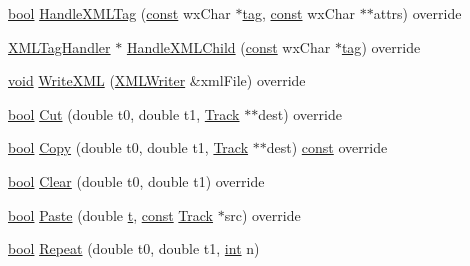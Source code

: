 \begin{DoxyCompactItemize}
\item 
\hyperlink{mac_2config_2i386_2lib-src_2libsoxr_2soxr-config_8h_abb452686968e48b67397da5f97445f5b}{bool} \hyperlink{class_label_track_a1747ad150def0002e512c71213ca3fb8}{Handle\+X\+M\+L\+Tag} (\hyperlink{getopt1_8c_a2c212835823e3c54a8ab6d95c652660e}{const} wx\+Char $\ast$\hyperlink{structtag}{tag}, \hyperlink{getopt1_8c_a2c212835823e3c54a8ab6d95c652660e}{const} wx\+Char $\ast$$\ast$attrs) override
\item 
\hyperlink{class_x_m_l_tag_handler}{X\+M\+L\+Tag\+Handler} $\ast$ \hyperlink{class_label_track_a84b196e796f05d3ce8d8ad14c128b6ef}{Handle\+X\+M\+L\+Child} (\hyperlink{getopt1_8c_a2c212835823e3c54a8ab6d95c652660e}{const} wx\+Char $\ast$\hyperlink{structtag}{tag}) override
\item 
\hyperlink{sound_8c_ae35f5844602719cf66324f4de2a658b3}{void} \hyperlink{class_label_track_a1441e6b9cd7eb6c4209e5b47fb41542b}{Write\+X\+ML} (\hyperlink{class_x_m_l_writer}{X\+M\+L\+Writer} \&xml\+File) override
\item 
\hyperlink{mac_2config_2i386_2lib-src_2libsoxr_2soxr-config_8h_abb452686968e48b67397da5f97445f5b}{bool} \hyperlink{class_label_track_a5684ef2dd7276d9b8818748b7f2427f3}{Cut} (double t0, double t1, \hyperlink{class_track}{Track} $\ast$$\ast$dest) override
\item 
\hyperlink{mac_2config_2i386_2lib-src_2libsoxr_2soxr-config_8h_abb452686968e48b67397da5f97445f5b}{bool} \hyperlink{class_label_track_aee8ad8e315214951cba5f532c9c8a6e5}{Copy} (double t0, double t1, \hyperlink{class_track}{Track} $\ast$$\ast$dest) \hyperlink{getopt1_8c_a2c212835823e3c54a8ab6d95c652660e}{const}  override
\item 
\hyperlink{mac_2config_2i386_2lib-src_2libsoxr_2soxr-config_8h_abb452686968e48b67397da5f97445f5b}{bool} \hyperlink{class_label_track_adde95fb86cb356fcf0569560f84732da}{Clear} (double t0, double t1) override
\item 
\hyperlink{mac_2config_2i386_2lib-src_2libsoxr_2soxr-config_8h_abb452686968e48b67397da5f97445f5b}{bool} \hyperlink{class_label_track_a9c593d64e402ac9667f0868fedf22b62}{Paste} (double \hyperlink{octave__test_8m_aaccc9105df5383111407fd5b41255e23}{t}, \hyperlink{getopt1_8c_a2c212835823e3c54a8ab6d95c652660e}{const} \hyperlink{class_track}{Track} $\ast$src) override
\item 
\hyperlink{mac_2config_2i386_2lib-src_2libsoxr_2soxr-config_8h_abb452686968e48b67397da5f97445f5b}{bool} \hyperlink{class_label_track_a1306746f8abe5e15a21949ffab23ea11}{Repeat} (double t0, double t1, \hyperlink{xmltok_8h_a5a0d4a5641ce434f1d23533f2b2e6653}{int} n)
$$
\end{DoxyCompactItemize}
